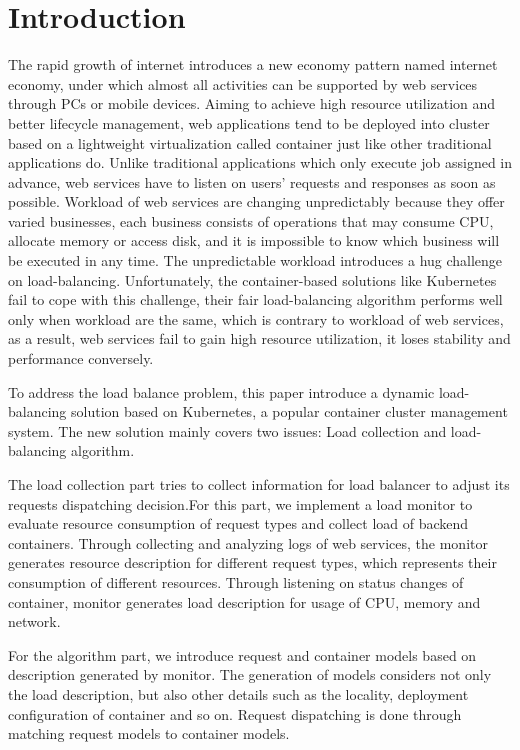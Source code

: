 \section{Introduction}
\label{sec:introduction}

The rapid growth of internet introduces a new economy pattern named internet economy, under which almost all activities can be supported by web services through PCs or mobile devices. Aiming to achieve high resource utilization and better lifecycle management, web applications tend to be deployed into cluster based on a lightweight virtualization called container just like other traditional applications do. Unlike traditional applications which only execute job assigned in advance, web services have to listen on users'  requests and responses as soon as possible. Workload of web services are changing unpredictably because they offer varied businesses, each business consists of operations that may consume CPU, allocate memory or access disk, and it is impossible to know which business will be executed in any time. The unpredictable workload introduces a hug challenge on load-balancing. Unfortunately, the container-based solutions like Kubernetes fail to cope with this challenge, their fair load-balancing algorithm performs well only when workload are the same, which is contrary to workload of web services, as a result, web services fail to gain high resource utilization, it loses stability and performance conversely.

To address the load balance problem, this paper introduce a dynamic load-balancing solution based on Kubernetes, a popular container cluster management system. The new solution mainly covers two issues: Load collection and load-balancing algorithm.

The load collection part tries to collect information for load balancer to adjust its requests dispatching decision.For this part, we implement a load monitor to evaluate resource consumption of request types and collect load of backend containers. Through collecting and analyzing logs of web services, the monitor generates resource description for different request types, which represents their consumption of different resources. Through listening on status changes of container, monitor generates load description for usage of CPU, memory and network.

For the algorithm part, we introduce request and container models based on description generated by monitor. The generation of models considers not only the load description, but also other details such as the locality, deployment configuration of container and so on. Request dispatching is done through matching request models to container models.

